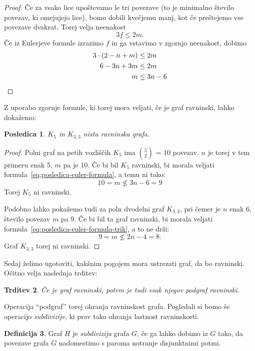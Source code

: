 \documentclass[12pt,a4paper]{amsart}
\theoremstyle{definition} %
\newtheorem{definicija}{Definicija}[section]
\theoremstyle{plain} %
\newtheorem{trditev}[definicija]{Trditev}
\newtheorem{posledica}[definicija]{Posledica}
\begin{document}
\begin{proof}
    Če za vsako lice upoštevamo le tri povezave (to je minimalno število povezav, ki omejujejo lice), bomo dobili kvečjemu manj, kot če preštejemo vse povezave dvakrat. Torej velja neenakost
    \[ 3f \leq 2m .\]
    Če iz Eulerjeve formule izrazimo $f$ in ga vstavimo v zgornjo neenakost, dobimo
    \begin{align*}
        3\cdot(2-n+m) &\leq 2m \\
        6 - 3n + 3m &\leq 2m \\
        m &\leq 3n - 6 \qedhere
    \end{align*}
\end{proof}

Z uporabo zgornje formule, ki torej mora veljati, če je graf ravninski, lahko dokažemo:
\begin{posledica}
    \label{posl:neravninska-grafa}
    $K_5$ in $K_{3,3}$ nista ravninska grafa.
\end{posledica}

\begin{proof}
    Polni graf na petih vozliščih $K_5$ ima {$5 \choose 2$} = 10 povezav. $n$ je torej v tem primeru enak
    5, $m$ pa je 10. Če bi bil $K_5$ ravninski, bi morala veljati formula~\ref{eq:posledica-euler-formula},
    a temu ni tako:
    \[ 10 = m \nleq 3n - 6 = 9 \]
    Torej $K_5$ ni ravninski.
    
    Podobno lahko pokažemo tudi za poln dvodelni graf $K_{3,3}$, pri čemer je $n$ enak 6, število povezav $m$ pa 9. Če bi bil ta graf ravninski, bi morala veljati formula~\ref{eq:posledica-euler-formula-trik}, a to ne drži:
    \[ 9 = m \nleq 2n - 4 = 8. \] 
    Graf $K_{3,3}$ torej ni ravninski. \qedhere
\end{proof}

Sedaj želimo ugotoviti, kakšnim pogojem mora ustrezati graf, da bo ravninski. Očitno velja naslednja trditev:

\begin{trditev}
    \label{trd:podgraf}
    Če je graf ravninski, potem je tudi vsak njegov podgraf ravninski. %
\end{trditev}

Operacija ``podgraf'' torej ohranja ravninskost grafa.
Pogledali si bomo še operacijo \emph{subdivizije}, ki prav tako ohranja lastnost ravninskosti.

\begin{definicija}
    Graf $H$ je \emph{subdivizija} grafa $G$, če ga lahko dobimo iz $G$ tako, da povezave grafa $G$ nadomestimo s paroma notranje disjunktnimi potmi.
\end{definicija}
\end{document}
